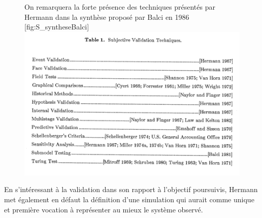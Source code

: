 \begin{figure}[h]
\begin{sidecaption}[fortoc]{ On remarquera la forte présence des techniques présentés par Hermann dans la synthèse proposé par Balci en 1986 \autocite{Balci1986}}[fig:S_syntheseBalci]
  \centering
 \includegraphics[width=.9\linewidth]{subjective_balci.png}
  \end{sidecaption}
\end{figure}




En s'intéressant à la validation dans son rapport à l'objectif poursuivis, Hermann met également en défaut la définition d'une simulation qui aurait comme unique et première vocation à représenter au mieux le système observé. 

